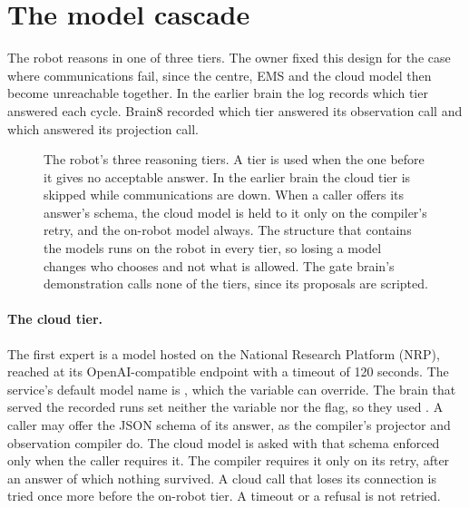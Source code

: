 \section{The model cascade}\label{sec:home-cascade}

The robot reasons in one of three tiers. The owner fixed this design for the case where
communications fail, since the centre, EMS and the cloud model then become unreachable together. In
the earlier brain the log records which tier answered each cycle. Brain8 recorded
which tier answered its observation call and which answered its projection call.

\begin{figure}[t]
\centering

\caption{The robot's three reasoning tiers. A tier is used when the one before it gives no
acceptable answer. In the earlier brain the cloud tier is skipped while communications are down.
When a caller offers its answer's schema, the cloud model is held to it only on the compiler's
retry, and the on-robot model always. The structure that
contains the models runs on the robot in every tier, so losing a model changes who chooses and not
what is allowed. The gate brain's demonstration calls none of the tiers, since its proposals are
scripted.}
\label{fig:home-cascade}
\end{figure}

\paragraph{The cloud tier.} The first expert is a model hosted on the National Research Platform
(NRP), reached at its OpenAI-compatible endpoint with a timeout of 120 seconds. The service's default
model name is , which the variable  can override. The brain
that served the recorded runs set neither the variable nor the flag, so they used .
A caller may offer the JSON schema of its answer, as the compiler's projector and observation
compiler do. The cloud model is asked with that schema enforced only when the caller requires it.
The compiler requires it only on its retry, after an answer of which nothing survived. A cloud call
that loses its connection is tried once more before the on-robot tier. A timeout or a refusal is not
retried.

